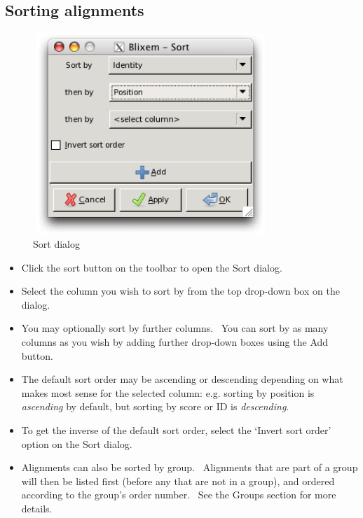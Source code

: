 \documentclass[letterpaper]{article}
\newcommand\liststyleWWviiiNumxxvi{%
\renewcommand\labelitemi{{\textbullet}}
\renewcommand\labelitemii{o}
\renewcommand\labelitemiii{[F0A7?]}
\renewcommand\labelitemiv{[F0B7?]}
}
\begin{document}
{\color[rgb]{0.30980393,0.5058824,0.7411765}\subsection[Sorting alignments]{Sorting alignments}}
\hypertarget{RefHeading2001056909880}{}\liststyleWWviiiNumxxvi

\begin{figure}
\centering
\color[rgb]{0.30980393,0.5058824,0.7411765}
\includegraphics[width=8.881cm,height=7.602cm]{img_dialog_sort.png}
\caption{Sort dialog}
\end{figure}

\liststyleWWviiiNumxxvi
\begin{itemize}
\item {
Click the sort button on the toolbar to open the Sort dialog.}
\item {
Select the column you wish to sort by from the top drop-down box on the
dialog.}
\item {
You may optionally sort by further columns. \ You can sort by as many
columns as you wish by adding further drop-down boxes using the Add
button.}
\item {
The default sort order may be ascending or descending depending on what
makes most sense for the selected column: e.g. sorting by position is
\textit{ascending} by default, but sorting by score or ID is \textit{descending}.}
\item {
To get the inverse of the default sort order, select the
{\textquoteleft}Invert sort order{\textquoteright} option on the Sort
dialog.}
\item {
Alignments can also be sorted by group. \ Alignments that are part of a
group will then be listed first (before any that are not in a group),
and ordered according to the group{\textquoteright}s order number.
\ See the Groups section for more details.}
\end{itemize}
\end{document}
